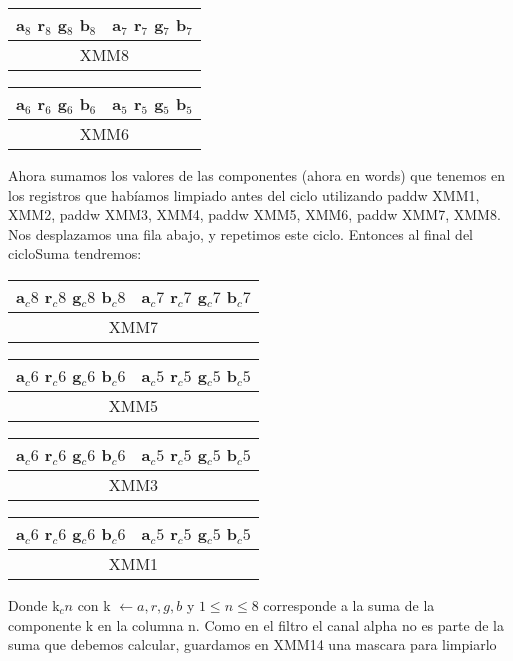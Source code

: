 \begin{table}[!h]
	\centering
	\begin{tabular}{| c | c |}
		\hline
		a$_8$ r$_8$ g$_8$ b$_8$ & a$_7$ r$_7$ g$_7$ b$_7$
		\\ \hline
		\multicolumn{2}{c}{XMM8} \\
	\end{tabular}
		\begin{tabular}{| c | c |}
		\hline
		a$_6$ r$_6$ g$_6$ b$_6$ & a$_5$ r$_5$ g$_5$ b$_5$
		\\ \hline
		\multicolumn{2}{c}{XMM6} \\
	\end{tabular}
\end{table}

Ahora sumamos los valores de las componentes (ahora en words) que tenemos en los registros que habíamos limpiado antes del ciclo utilizando paddw XMM1, XMM2, paddw XMM3, XMM4, paddw XMM5, XMM6, paddw XMM7, XMM8. Nos desplazamos una fila abajo, y repetimos este ciclo. Entonces al final del cicloSuma tendremos:

\begin{table}[!h]
	\centering
	\begin{tabular}{| c | c |}
		\hline
		a$_c8$ r$_c8$ g$_c8$ b$_c8$ & a$_c7$ r$_c7$ g$_c7$ b$_c7$
		\\ \hline
		\multicolumn{2}{c}{XMM7} \\
	\end{tabular}
	\begin{tabular}{| c | c |}
		\hline
		a$_c6$ r$_c6$ g$_c6$ b$_c6$ & a$_c5$ r$_c5$ g$_c5$ b$_c5$
		\\ \hline
		\multicolumn{2}{c}{XMM5} \\
	\end{tabular}
	\begin{tabular}{| c | c |}
		\hline
		a$_c6$ r$_c6$ g$_c6$ b$_c6$ & a$_c5$ r$_c5$ g$_c5$ b$_c5$
		\\ \hline
		\multicolumn{2}{c}{XMM3} \\
	\end{tabular}
	\begin{tabular}{| c | c |}
		\hline
		a$_c6$ r$_c6$ g$_c6$ b$_c6$ & a$_c5$ r$_c5$ g$_c5$ b$_c5$
		\\ \hline
		\multicolumn{2}{c}{XMM1} \\
	\end{tabular}
\end{table}

Donde k$_cn$ con k $\leftarrow {a,r,g,b}$ y $1 \leq n \leq 8$ corresponde a la suma de la componente k en la columna n. Como en el filtro el canal alpha no es parte de la suma que debemos calcular, guardamos en XMM14 una mascara para limpiarlo

